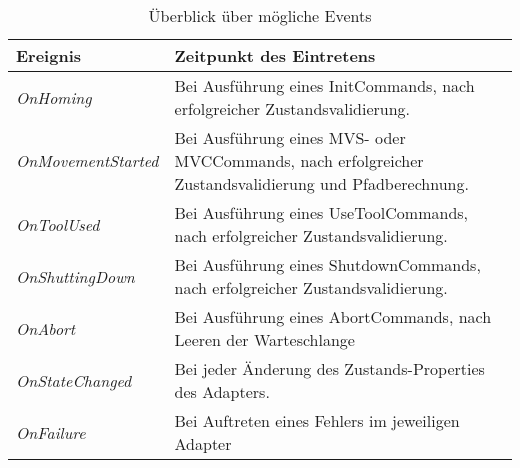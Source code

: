 \begin{table}[H]
\begin{tabular}{|p{5cm}|p{9cm}|}
\hline \rowcolor{lightgray}
\textbf{Ereignis} & \textbf{Zeitpunkt des Eintretens}\\
\hline
\textit{OnHoming} & Bei Ausführung eines InitCommands, nach erfolgreicher Zustandsvalidierung.\\
\hline
\textit{OnMovementStarted} & Bei Ausführung eines MVS- oder MVCCommands, nach erfolgreicher Zustandsvalidierung und Pfadberechnung.\\
\hline
\textit{OnToolUsed} & Bei Ausführung eines UseToolCommands, nach erfolgreicher Zustandsvalidierung.\\
\hline
\textit{OnShuttingDown} & Bei Ausführung eines ShutdownCommands, nach erfolgreicher Zustandsvalidierung.\\
\hline
\textit{OnAbort} & Bei Ausführung eines AbortCommands, nach Leeren der Warteschlange\\ 
\hline
\textit{OnStateChanged} & Bei jeder Änderung des Zustands-Properties des Adapters.\\
\hline
\textit{OnFailure} & Bei Auftreten eines Fehlers im jeweiligen Adapter\\
\hline
\end{tabular}
\caption{Überblick über mögliche Events}
\end{table}

